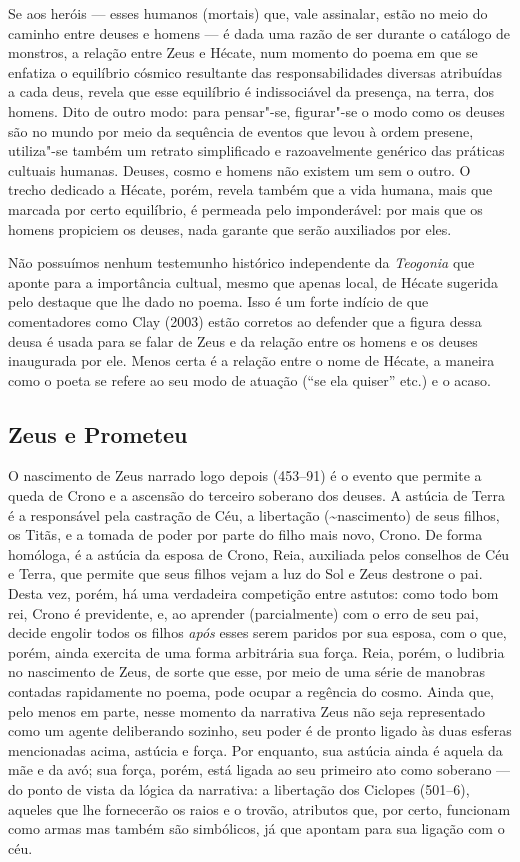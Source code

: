 Se aos heróis --- esses humanos (mortais) que, vale assinalar, estão no
meio do caminho entre deuses e homens --- é dada uma razão de ser durante
o catálogo de monstros, a relação entre Zeus e Hécate, num momento do
poema em que se enfatiza o equilíbrio cósmico resultante das
responsabilidades diversas atribuídas a cada deus, revela que esse
equilíbrio é indissociável da presença, na terra, dos homens. Dito de
outro modo: para pensar"-se, figurar"-se o modo como os deuses são no
mundo por meio da sequência de eventos que levou à ordem presene,
utiliza"-se também um retrato simplificado e razoavelmente genérico das
práticas cultuais humanas. Deuses, cosmo e homens não existem um sem o
outro. O trecho dedicado a Hécate, porém, revela também que a vida
humana, mais que marcada por certo equilíbrio, é permeada pelo
imponderável: por mais que os homens propiciem os deuses, nada garante
que serão auxiliados por eles.

Não possuímos nenhum testemunho histórico independente da
\emph{Teogonia} que aponte para a importância cultual, mesmo que apenas
local, de Hécate sugerida pelo destaque que lhe dado no poema. Isso é um
forte indício de que comentadores como Clay (2003) estão corretos ao
defender que a figura dessa deusa é usada para se falar de Zeus e da
relação entre os homens e os deuses inaugurada por ele. Menos certa é a
relação entre o nome de Hécate, a maneira como o poeta se refere ao seu
modo de atuação (``se ela quiser'' etc.) e o acaso.

\subsection{Zeus e Prometeu}

O nascimento de Zeus narrado logo depois (453--91) é o evento que permite
a queda de Crono e a ascensão do terceiro soberano dos deuses. A astúcia
de Terra é a responsável pela castração de Céu, a libertação
(\textasciitilde{}nascimento) de seus filhos, os Titãs, e a tomada de
poder por parte do filho mais novo, Crono. De forma homóloga, é a
astúcia da esposa de Crono, Reia, auxiliada pelos conselhos de Céu e
Terra, que permite que seus filhos vejam a luz do Sol e Zeus destrone o
pai. Desta vez, porém, há uma verdadeira competição entre astutos: como
todo bom rei, Crono é previdente, e, ao aprender (parcialmente) com o
erro de seu pai, decide engolir todos os filhos \emph{após} esses serem
paridos por sua esposa, com o que, porém, ainda exercita de uma forma
arbitrária sua força. Reia, porém, o ludibria no nascimento de Zeus, de
sorte que esse, por meio de uma série de manobras contadas rapidamente
no poema, pode ocupar a regência do cosmo. Ainda que, pelo menos em
parte, nesse momento da narrativa Zeus não seja representado como um
agente deliberando sozinho, seu poder é de pronto ligado às duas esferas
mencionadas acima, astúcia e força. Por enquanto, sua astúcia ainda é
aquela da mãe e da avó; sua força, porém, está ligada ao seu primeiro
ato como soberano --- do ponto de vista da lógica da narrativa: a
libertação dos Ciclopes (501--6), aqueles que lhe fornecerão os raios e o
trovão, atributos que, por certo, funcionam como armas mas também são
simbólicos, já que apontam para sua ligação com o céu.

